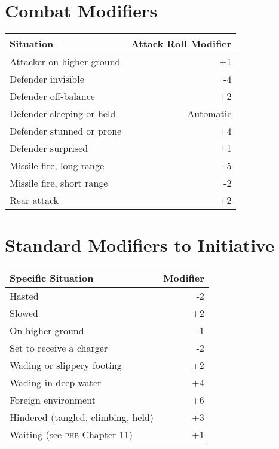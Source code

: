 \documentclass[10pt,letterpaper]{article}
\begin{document}
\noindent
\begin{minipage}[t]{0.495\textwidth}
  \section*{Combat Modifiers}
  \begin{tabularx}{\textwidth}{Xr}
    \toprule
    Situation & Attack Roll Modifier \\
    \midrule
    Attacker on higher ground & +1 \\
    Defender invisible & -4 \\
    Defender off-balance & +2 \\
    Defender sleeping or held & Automatic \\
    Defender stunned or prone & +4 \\
    Defender surprised & +1 \\
    Missile fire, long range & -5 \\
    Missile fire, short range & -2 \\
    Rear attack & +2 \\
    \bottomrule
  \end{tabularx}
\end{minipage}
\hfill
\begin{minipage}[t]{0.495\textwidth}
  \section*{Standard Modifiers to Initiative}
  \begin{tabularx}{\textwidth}{Xr}
    \toprule
    Specific Situation & Modifier \\
    \midrule
    Hasted & -2 \\
    Slowed & +2 \\
    On higher ground & -1 \\
    Set to receive a charger & -2 \\
    Wading or slippery footing & +2 \\
    Wading in deep water & +4 \\
    Foreign environment & +6 \\
    Hindered (tangled, climbing, held) & +3 \\
    Waiting (see {\scshape phb} Chapter 11) & +1 \\
    \bottomrule
  \end{tabularx}
\end{minipage}
\bigskip
\end{document}
